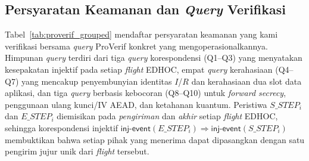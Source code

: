 \documentclass{easychair}
\begin{document}
\subsection{Persyaratan Keamanan dan \emph{Query} Verifikasi}
Tabel~\ref{tab:proverif_grouped} mendaftar persyaratan keamanan yang
kami verifikasi bersama \emph{query} ProVerif konkret yang
mengoperasionalkannya. Himpunan \emph{query} terdiri dari tiga
\emph{query} korespondensi (Q1--Q3) yang menyatakan kesepakatan
injektif pada setiap \emph{flight} EDHOC, empat \emph{query}
kerahasiaan (Q4--Q7) yang mencakup penyembunyian identitas $I$/$R$
dan kerahasiaan dua slot data aplikasi, dan tiga \emph{query}
berbasis kebocoran (Q8--Q10) untuk \emph{forward secrecy}, penggunaan
ulang kunci/IV AEAD, dan ketahanan kuantum. Peristiwa $S\_STEP_i$
dan $E\_STEP_i$ diemisikan pada \emph{pengiriman} dan \emph{akhir}
setiap \emph{flight} EDHOC, sehingga korespondensi injektif
$\mathsf{inj\text{-}event}(E\_STEP_i)\Rightarrow
\mathsf{inj\text{-}event}(S\_STEP_i)$ membuktikan bahwa setiap pihak
yang menerima dapat dipasangkan dengan satu pengirim jujur unik dari
\emph{flight} tersebut.
\end{document}
